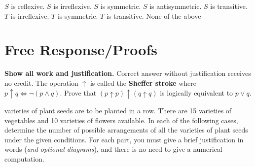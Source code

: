 \documentclass[10pt, addpoints]{exam}
\theoremstyle{definition}
\begin{document}
\begin{questions}
\begin{parts}
\begin{choices}
\choice $S$ is reflexive. %
\choice $S$ is irreflexive. %
\choice $S$ is symmetric. %
\choice $S$ is antisymmetric. %
\choice $S$ is transitive. %
\choice $T$ is irreflexive. %
\choice $T$ is symmetric. %
\choice $T$ is transitive. %
\choice None of the above
\end{choices}
%
\vfill


\end{parts}


\newpage
\section*{Free Response/Proofs}
\noindent
\textbf{Show all work and justification.} Correct answer without justification receives no credit.
\question[4] 
The operation $\uparrow$ is called the \textbf{Sheffer stroke} where $p \uparrow q \iff \neg(p\wedge q)$. 
Prove that $(p\uparrow p)\uparrow (q\uparrow q)$ is logically equivalent to $p\vee q$. 

 
\newpage
 varieties of plant seeds are to be planted in a row. There are 15 varieties of vegetables and 10 varieties of flowers available. In each of the following cases, determine the number of possible arrangements of all the varieties of plant seeds under the given conditions.  For each part, you must give a brief justification in words (\textit{and optional diagrams}), and there is no need to give a numerical computation.
\end{questions}
\end{document}
